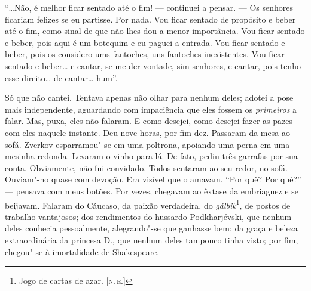 ``\ldots{}Não, é melhor ficar sentado até o fim! --- continuei a pensar. --- Os
senhores ficariam felizes se eu partisse. Por nada. Vou ficar sentado de
propósito e beber até o fim, como sinal de que não lhes dou a menor
importância. Vou ficar sentado e beber, pois aqui é um botequim e eu
paguei a entrada. Vou ficar sentado e beber, pois os considero ums
fantoches, uns fantoches inexistentes. Vou ficar sentado e beber\ldots{} e
cantar, se me der vontade, sim senhores, e cantar, pois tenho esse
direito\ldots{} de cantar\ldots{} hum''.

Só que não cantei. Tentava apenas não olhar para nenhum deles; adotei a
pose mais independente, aguardando com impaciência que eles fossem os
\emph{primeiros} a falar. Mas, puxa, eles não falaram. E como desejei,
como desejei fazer as pazes com eles naquele instante. Deu nove horas,
por fim dez. Passaram da mesa ao sofá. Zverkov esparramou"-se em uma
poltrona, apoiando uma perna em uma mesinha redonda. Levaram o vinho
para lá. De fato, pediu três garrafas por sua conta. Obviamente, não fui
convidado. Todos sentaram ao seu redor, no sofá. Ouviam"-no quase com
devoção. Era visível que o amavam. ``Por quê? Por quê?'' --- pensava com
meus botões. Por vezes, chegavam ao êxtase da embriaguez e se beijavam.
Falaram do Cáucaso, da paixão verdadeira, do \emph{gálbik}\footnote{Jogo
  de cartas de azar. {[}\textsc{n.\,e.}{]}}, de postos de trabalho
vantajosos; dos rendimentos do hussardo Podkharjévski, que nenhum deles
conhecia pessoalmente, alegrando"-se que ganhasse bem; da graça e beleza
extraordinária da princesa D., que nenhum deles tampouco tinha visto;
por fim, chegou"-se à imortalidade de Shakespeare.

